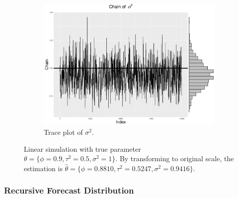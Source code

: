 \begin{figure}[h]
\begin{subfigure}[b]{0.32\textwidth}
    \includegraphics[width=\textwidth]{Chapters/05MCMCOU/plots/linear_sig2.pdf}
     \caption{Trace plot of $\sigma^2$.}
\end{subfigure}
\caption{Linear simulation with true parameter $\theta = \{\phi=0.9,\tau^2=0.5,\sigma^2=1\}$. By transforming to original scale, the estimation is $\hat{\theta}=\{ \phi = 0.8810, \tau^2 = 0.5247,\sigma^2= 0.9416\}$. }
\label{linearmarginplots}
\end{figure}



\subsubsection*{Recursive Forecast Distribution}\label{sectionlinearRecursive}

